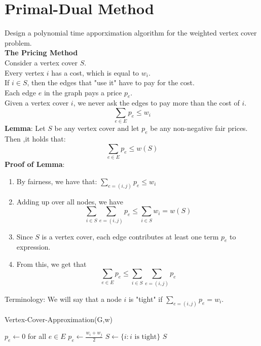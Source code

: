 \documentclass[onecolumn]{report}
\begin{document}
\section{Primal-Dual Method}
Design a polynomial time apporximation algorithm for the weighted vertex cover problem.\\
\textbf{The Pricing Method}\\
\indent Consider a vertex cover $S$.\\
\indent Every vertex $i$ has a cost, which is equal to $w_i$.\\
\indent If $i \in S$, then the edges that "use it" have to pay for the cost.\\
\indent Each edge $e$ in the graph pays a price $p_e$.\\
Given a vertex cover $i$, we never ask the edges to pay more than the cost of $i$.\\
\begin{equation*}
    \sum_{e \in E} p_e \leq w_i
\end{equation*}
\textbf{Lemma}: Let $S$ be any vertex cover and let $p_e$ be any non-negative fair prices. Then ,it holds that:\\
\begin{equation*}
    \sum_{e \in E} p_e \leq w(S)
\end{equation*}
\textbf{Proof of Lemma}:\\
\begin{enumerate}
    \item By fairness, we have that: $\sum_{e=(i,j)} p_e \leq w_i$
    \item Adding up over all nodes, we have 
    \begin{equation*}
        \sum_{i \in S} \sum_{e=(i,j)} p_e \leq \sum_{i \in S} w_i = w(S)
    \end{equation*}
    \item Since $S$ is a vertex cover, each edge contributes at least one term $p_e$ to expression.
    \item From this, we get that
    \begin{equation*}
        \sum_{e \in E} p_e \leq \sum_{i \in S} \sum_{e=(i,j)} p_e
    \end{equation*}
\end{enumerate}
Terminology: We will say that a node $i$ is "tight" if $\sum_{e=(i,j)} p_e = w_i$.\\
\begin{algorithm}[H]
\caption{Vertex-Cover-Approximation(G,w)}
\begin{algorithmic}[1]
\State $p_e \gets 0$ for all $e \in E$
    \State $p_e \gets \frac{w_i+w_j}{2}$
\EndWhile
\State $S \gets \{i: i \text{ is tight}\}$
\State \Return $S$
\end{algorithmic}
\end{algorithm}
\end{document}
